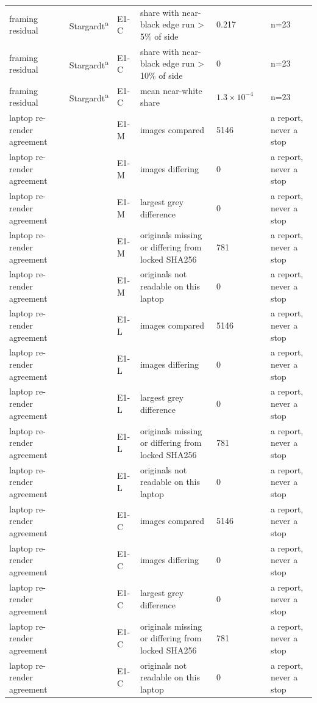 \begin{longtable}{@{}p{3.3cm}lp{1.5cm}p{3.6cm}p{2.2cm}p{1.6cm}p{3.2cm}@{}}
framing residual & Stargardt\textsuperscript{a} & E1-C & share with near-black edge run > 5\% of side & 0.217 &  & n=23 \\
framing residual & Stargardt\textsuperscript{a} & E1-C & share with near-black edge run > 10\% of side & 0 &  & n=23 \\
framing residual & Stargardt\textsuperscript{a} & E1-C & mean near-white share & $1.3\times10^{-4}$ &  & n=23 \\
laptop re-render agreement &  & E1-M & images compared & 5146 &  & a report, never a stop \\
laptop re-render agreement &  & E1-M & images differing & 0 &  & a report, never a stop \\
laptop re-render agreement &  & E1-M & largest grey difference & 0 &  & a report, never a stop \\
laptop re-render agreement &  & E1-M & originals missing or differing from locked SHA256 & 781 &  & a report, never a stop \\
laptop re-render agreement &  & E1-M & originals not readable on this laptop & 0 &  & a report, never a stop \\
laptop re-render agreement &  & E1-L & images compared & 5146 &  & a report, never a stop \\
laptop re-render agreement &  & E1-L & images differing & 0 &  & a report, never a stop \\
laptop re-render agreement &  & E1-L & largest grey difference & 0 &  & a report, never a stop \\
laptop re-render agreement &  & E1-L & originals missing or differing from locked SHA256 & 781 &  & a report, never a stop \\
laptop re-render agreement &  & E1-L & originals not readable on this laptop & 0 &  & a report, never a stop \\
laptop re-render agreement &  & E1-C & images compared & 5146 &  & a report, never a stop \\
laptop re-render agreement &  & E1-C & images differing & 0 &  & a report, never a stop \\
laptop re-render agreement &  & E1-C & largest grey difference & 0 &  & a report, never a stop \\
laptop re-render agreement &  & E1-C & originals missing or differing from locked SHA256 & 781 &  & a report, never a stop \\
laptop re-render agreement &  & E1-C & originals not readable on this laptop & 0 &  & a report, never a stop \\
\end{longtable}

